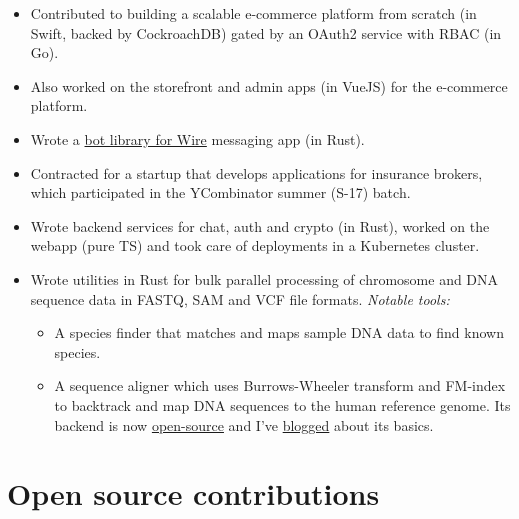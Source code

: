 \documentclass[11pt,a4paper,sans]{moderncv}        %
\newcommand\chref[3][linky]{\href{#2}{\color{#1}#3}}
\begin{document}
{\begin{itemize}
		\item Contributed to building a scalable e-commerce platform from scratch (in Swift, backed by CockroachDB) gated by an OAuth2 service with RBAC (in Go).
		\item Also worked on the storefront and admin apps (in VueJS) for the e-commerce platform.
		\item Wrote a \chref{https://github.com/OmnijarBots/beryllium}{bot library for Wire} messaging app (in Rust).
	\end{itemize}}

{\begin{itemize}
		\item Contracted for a startup that develops applications for insurance brokers, which participated in the YCombinator summer (S-17) batch.
		\item Wrote backend services for chat, auth and crypto (in Rust), worked on the webapp (pure TS) and took care of deployments in a Kubernetes cluster.
	\end{itemize}}

{\begin{itemize}
		\item Wrote utilities in Rust for bulk parallel processing of chromosome and DNA sequence data in FASTQ, SAM and VCF file formats.
		\textit{Notable tools:}
		{\begin{itemize}
				\item A species finder that matches and maps sample DNA data to find known species.
				\item A sequence aligner which uses Burrows-Wheeler transform and FM-index to backtrack and map DNA sequences to the human reference genome. Its backend is now \chref{https://github.com/wafflespeanut/nucleic-acid}{open-source} and I've \chref{https://blog.waffles.space/2017/02/12/exploring-the-human-genome-part-1/}{blogged} about its basics.
			\end{itemize}}
		\end{itemize}}

\section{Open source contributions}
\end{document}
